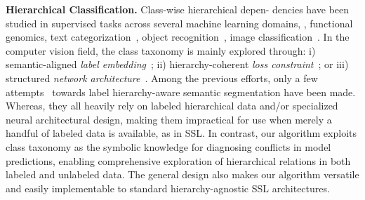 \documentclass[10pt,twocolumn,letterpaper]{article}
\begin{document}
\noindent\textbf{Hierarchical Classification.} Class-wise hierarchical depen- dencies have been studied in supervised tasks across several machine learning domains, \eg, functional genomics, text categorization~\cite{rousu2006kernel}, object recognition~\cite{marszalek2007semantic,grauman2011learning,hwang2012semantic}, image classification~\cite{bengio2010label,deng2010does}.
In the computer vision field, the class taxonomy is mainly explored through: i) semantic-aligned \textit{label embedding}~\cite{xian2016latent,frome2013devise,akata2015evaluation}; ii) hierarchy-coherent \textit{loss constraint}~\cite{deng2010does,verma2012learning,zhao2011large}; or iii) structured \textit{network architecture}~\cite{ahmed2016network,yan2015hd,zweig2007exploiting}.
Among the previous efforts, only a few attempts~\cite{li2022deep,wang2020hierarchical,wang2021hierarchical,wang2019learning,saha2022improving} towards label hierarchy-aware semantic segmentation have been made. Whereas, they all heavily rely on labeled hierarchical data and/or specialized neural architectural design, making them impractical for use when merely a handful of labeled data is available, as in SSL.
In contrast, our algorithm exploits class taxonomy as the symbolic knowledge for diagnosing conflicts in model predictions, enabling comprehensive exploration of hierarchical relations in both labeled and unlabeled data. The general design also makes our algorithm versatile and easily implementable to standard hierarchy-agnostic SSL architectures.
\end{document}
